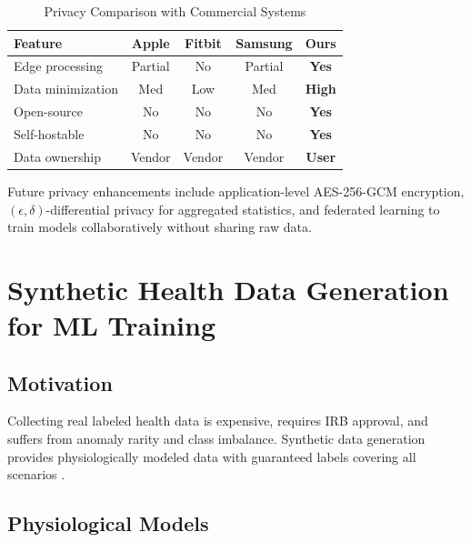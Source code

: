 \documentclass[conference]{IEEEtran}
\begin{document}
\begin{table}[H]
\centering
\caption{Privacy Comparison with Commercial Systems}
\label{tab:privacy_comparison}
\begin{tabular}{lcccc}
\toprule
\textbf{Feature} & \textbf{Apple} & \textbf{Fitbit} & \textbf{Samsung} & \textbf{Ours} \\
\midrule
Edge processing & Partial & No & Partial & \textbf{Yes} \\
Data minimization & Med & Low & Med & \textbf{High} \\
Open-source & No & No & No & \textbf{Yes} \\
Self-hostable & No & No & No & \textbf{Yes} \\
Data ownership & Vendor & Vendor & Vendor & \textbf{User} \\
\bottomrule
\end{tabular}
\end{table}

Future privacy enhancements include application-level AES-256-GCM encryption, $(\epsilon, \delta)$-differential privacy for aggregated statistics, and federated learning to train models collaboratively without sharing raw data.



\section{Synthetic Health Data Generation for ML Training}

\subsection{Motivation}
Collecting real labeled health data is expensive, requires IRB approval, and suffers from anomaly rarity and class imbalance. Synthetic data generation provides physiologically modeled data with guaranteed labels covering all scenarios \cite{synthetic_health}.

\subsection{Physiological Models}
\end{document}
